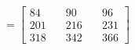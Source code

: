\documentclass[preview]{standalone}
\begin{document}
\begin{align*}
=\begin{bmatrix} 84 & \quad 90 & \quad 96 \\ 201 & \quad 216 & \quad 231 \\ 318 & \quad 342 & \quad 366 \end{bmatrix}
\end{align*}
\end{document}
